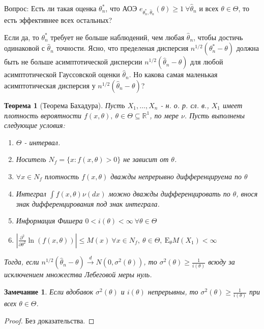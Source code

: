 \documentclass[12pt]{article}
\newtheorem*{remark}{Замечание}
\theoremstyle{basic_theorem}
\theoremstyle{name_theorem}
\newtheorem*{named_theorem}{Теорема}
\def\R{
    \mathbb{R}
}
\def\E{
    \mathrm{E}
}
\begin{document}
    Вопрос: Есть ли такая оценка $\theta^*_n$, что АОЭ $e_{\theta^*_n, \hat{\theta}_n}(\theta) \geq 1 \ \forall \hat{\theta}_n$
    и всех $\theta \in \Theta$, то есть эффективнее всех остальных?
    
    Если да, то $\theta^*_n$ требует не больше наблюдений, чем любая $\hat{\theta}_n$, чтобы достичь одинаковой с $\hat{\theta}_n$ точности.
    Ясно, что пределеная дисперсия $n^{1/2}(\theta^*_n - \theta)$ должна быть не больше асимптотической дисперсии
    $n^{1/2}(\hat{\theta}_n - \theta)$ для любой асимптотической Гауссовской оценки $\hat{\theta}_n$. Но
    какова самая маленькая асимптотическая дисперсия у $n^{1/2}(\hat{\theta}_n - \theta)$?
    
    \begin{named_theorem}[Теорема Бахадура]
        \label{th::bahadur}
        Пусть $X_1, \ldots, X_n$ - н. о. р. сл. в., $X_1$ имеет
        плотность вероятности $f(x, \theta),\ \theta \in \Theta \subseteq \R^1$,
        по мере $\nu$. Пусть выполнены следующие условия:
        \begin{enumerate}
            \item $\Theta$ - интервал.
            \item Носитель $N_f = \{x: f(x, \theta) > 0\}$ не зависит от $\theta$.
            \item \label{th::bahadur:density} $\forall x \in N_f$ плотность $f(x, \theta)$ дважды непрерывно
                дифференцируема по $\theta$
            \item \label{th::bahadur:integral} Интеграл $\int f(x, \theta)\nu(dx)$  можно
                дважды дифференцировать по $\theta$, внося знак
                дифференцирования под знак интеграла.
            \item Информация Фишера $0 < i(\theta) < \infty \ \forall \theta \in \Theta$
            \item \label{th::bahadur:second_partial} $|\frac{\partial^2}{\partial \theta^2} \ln(f(x, \theta))| \leq M(x) \ \forall x \in N_f, \ \theta \in \Theta, \ \E_\theta M(X_1) < \infty$ 
        \end{enumerate}
        Тогда, если $n^{1/2}(\hat{\theta}_n - \theta) \xrightarrow{d} N(0, \sigma^2(\theta))$,
        то $\sigma^2(\theta) \geq \frac{1}{i(\theta)}$ всюду за исключением
        множества Лебеговой меры нуль.
    \end{named_theorem}
    \begin{remark}
        Если вдобавок $\sigma^2(\theta)$ и $i(\theta)$ непрерывны,
        то $\sigma^2(\theta) \geq \frac{1}{i(\theta)}$ при всех $\theta \in \Theta$.
    \end{remark}
    \begin{proof}
        Без доказательства.
    \end{proof}
\end{document}
